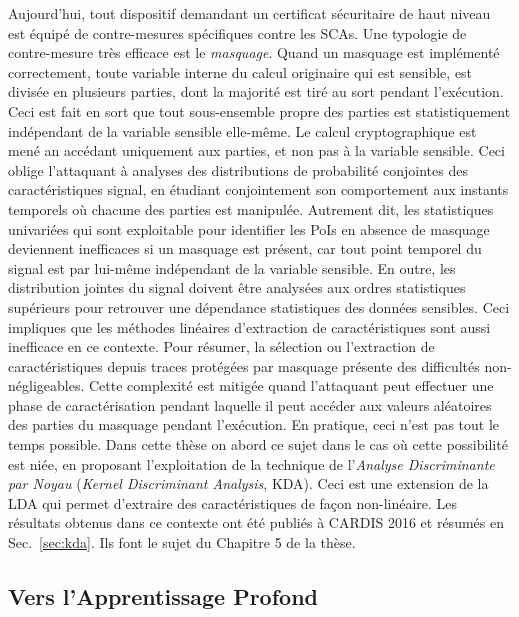 Aujourd'hui, tout dispositif demandant un certificat s\'{e}curitaire de haut niveau est \'{e}quip\'{e} de contre-mesures sp\'{e}cifiques contre les SCAs. Une typologie de contre-mesure tr\`{e}s efficace est le \emph{masquage}. Quand un masquage est impl\'{e}ment\'{e} correctement, toute variable interne du calcul originaire qui est sensible, est divis\'{e}e en plusieurs parties, dont la majorit\'{e} est tir\'{e} au sort pendant l'ex\'{e}cution. Ceci est fait en sort que tout sous-ensemble propre des parties est statistiquement ind\'{e}pendant de la variable sensible elle-m\^{e}me. Le calcul cryptographique est men\'{e} an acc\'{e}dant uniquement aux parties, et non pas \`{a} la variable sensible. Ceci oblige l'attaquant \`{a} analyses des distributions de probabilit\'{e} conjointes des caract\'{e}ristiques signal, en \'{e}tudiant conjointement son comportement aux instants temporels o\`u chacune des parties est manipul\'{e}e. Autrement dit, les statistiques univari\'{e}es qui sont exploitable pour identifier les PoIs en absence de masquage deviennent inefficaces si un masquage est pr\'{e}sent, car tout point temporel du signal est par lui-m\^{e}me ind\'{e}pendant de la variable sensible. En outre, les distribution jointes du signal doivent \^{e}tre analys\'{e}es aux ordres statistiques sup\'{e}rieurs pour retrouver une d\'{e}pendance statistiques des donn\'{e}es sensibles. Ceci impliques que les m\'{e}thodes lin\'{e}aires d'extraction de caract\'{e}ristiques sont aussi inefficace en ce contexte. Pour r\'{e}sumer, la s\'{e}lection ou l'extraction de caract\'{e}ristiques depuis traces prot\'{e}g\'{e}es par masquage pr\'{e}sente des difficult\'{e}s non-n\'{e}gligeables. Cette complexit\'{e} est mitig\'{e}e quand l'attaquant peut effectuer une phase de caract\'{e}risation pendant laquelle il peut acc\'{e}der aux valeurs al\'{e}atoires des parties du masquage pendant l'ex\'{e}cution. En pratique, ceci n'est pas tout le temps possible. Dans cette th\`{e}se on abord ce sujet dans le cas o\`{u} cette possibilit\'{e} est ni\'{e}e, en proposant l'exploitation de la technique de l'\emph{Analyse Discriminante par Noyau} (\emph{Kernel Discriminant Analysis}, KDA). Ceci est une extension de la LDA qui permet d'extraire des caract\'{e}ristiques de façon non-lin\'{e}aire.  Les r\'{e}sultats obtenus dans ce contexte ont \'{e}t\'{e} publi\'{e}s \`{a} CARDIS 2016 \cite{cagli2016kernel} et r\'{e}sum\'{e}s en Sec.~\ref{sec:kda}. Ils font le sujet du Chapitre 5 de la th\`ese.

\subsection{Vers l'Apprentissage Profond}\label{sec:NN_intro} 


